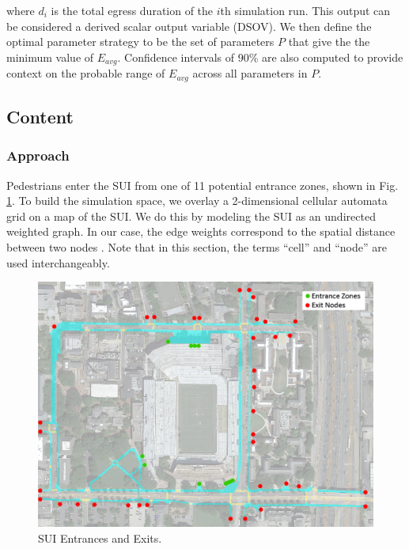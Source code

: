 \documentclass[12pt]{article}
\begin{document}
where $d_i$ is the total egress duration of the $i$th simulation run. This
output can be considered a derived scalar output variable (DSOV). We then
define the optimal parameter strategy to be the set of parameters $P$ that
give the the minimum value of $E_{avg}$. Confidence intervals of 90\% are also
computed to provide context on the probable range of $E_{avg}$ across all
parameters in $P$.

\subsection{Content}

\subsubsection{Approach}
Pedestrians enter the SUI from one of 11 potential entrance zones, shown in
Fig. \ref{fig:mapentranceexits}. To build the simulation space, we overlay a
2-dimensional cellular automata grid on a map of the SUI. We do this by modeling
the SUI as an undirected weighted graph. In our case, the edge weights correspond
to the spatial distance between two nodes \cite{west2001introduction}. Note
that in this section, the terms ``cell'' and ``node'' are used interchangeably.

\begin{figure}[t]
  \includegraphics[width=\linewidth,natwidth=1026,natheight=750]{GATechMap_20160301_EntranceExits.png}
  \caption{SUI Entrances and Exits.}
  \label{fig:mapentranceexits}
\end{figure}
\end{document}
